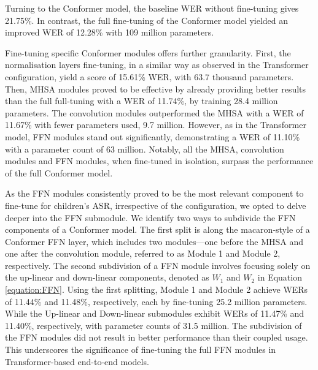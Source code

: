 Turning to the Conformer model, the baseline \ac{WER} without fine-tuning gives 21.75\%. In contrast, the full fine-tuning of the Conformer model yielded an improved \ac{WER} of 12.28\% with 109 million parameters.

Fine-tuning specific Conformer modules offers further granularity. First, the normalisation layers fine-tuning, in a similar way as observed in the Transformer configuration, yield a score of 15.61\% WER, with 63.7 thousand parameters. Then, \ac{MHSA} modules proved to be effective by already providing better results than the full full-tuning with a \ac{WER} of 11.74\%, by training 28.4 million parameters. The convolution modules outperformed the \ac{MHSA} with a \ac{WER} of 11.67\% with fewer parameters used, 9.7 million. However, as in the Transformer model, \ac{FFN} modules stand out significantly, demonstrating a \ac{WER} of 11.10\% with a parameter count of 63 million. Notably, all the \ac{MHSA}, convolution modules and \ac{FFN} modules, when fine-tuned in isolation, surpass the performance of the full Conformer model.


As the \ac{FFN} modules consistently proved to be the most relevant component to fine-tune for children's \ac{ASR}, irrespective of the configuration, we opted to delve deeper into the \ac{FFN} submodule. We identify two ways to subdivide the \ac{FFN} components of a Conformer model. The first split is along the macaron-style of a Conformer \ac{FFN} layer, which includes two modules—one before the \ac{MHSA} and one after the convolution module, referred to as Module 1 and Module 2, respectively. The second subdivision of a \ac{FFN} module involves focusing solely on the up-linear and down-linear components, denoted as $W_1$ and $W_2$ in Equation \ref{equation:FFN}. Using the first splitting, Module 1 and Module 2 achieve \acp{WER} of 11.44\% and 11.48\%, respectively, each by fine-tuning 25.2 million parameters. While the Up-linear and Down-linear submodules exhibit \acp{WER} of 11.47\% and 11.40\%, respectively, with parameter counts of 31.5 million. The subdivision of the \ac{FFN} modules did not result in better performance than their coupled usage. This underscores the significance of fine-tuning the full \ac{FFN} modules in Transformer-based end-to-end models.

